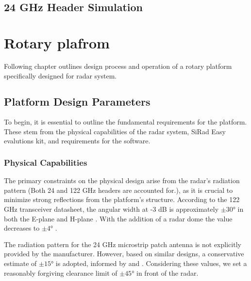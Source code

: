 
\section{24 GHz Header Simulation}




\chapter{Rotary plafrom}

Following chapter outlines design process and operation of a rotary platform specifically designed for \sidar radar system.

\section{Platform Design Parameters}


To begin, it is essential to outline the fundamental requirements for the platform.
These stem from the physical capabilities of the radar system, SiRad Easy evalutions kit, and requirements for the software.

\subsection{Physical Capabilities}


The primary constraints on the physical design arise from the radar's radiation pattern (Both 24 and 122 GHz headers are accounted for.), as it is crucial to minimize strong reflections from the platform's structure. According to the 122 GHz transceiver datasheet, the angular width at -3 dB is approximately $\pm30\text{°}$ in both the E-plane and H-plane \cite{sidarTRX}. With the addition of a radar dome the value decreases to $\pm4\text{°}$ \cite{sidarMAN}.

The radiation pattern for the 24 GHz microstrip patch antenna is not explicitly provided by the manufacturer. However, based on similar designs, a conservative estimate of $\pm15\text{°}$ is adopted, informed by \cite{patch1} and \cite{patch2}. Considering these values, we set a reasonably forgiving clearance limit of $\pm45\text{°}$ in front of the radar.


